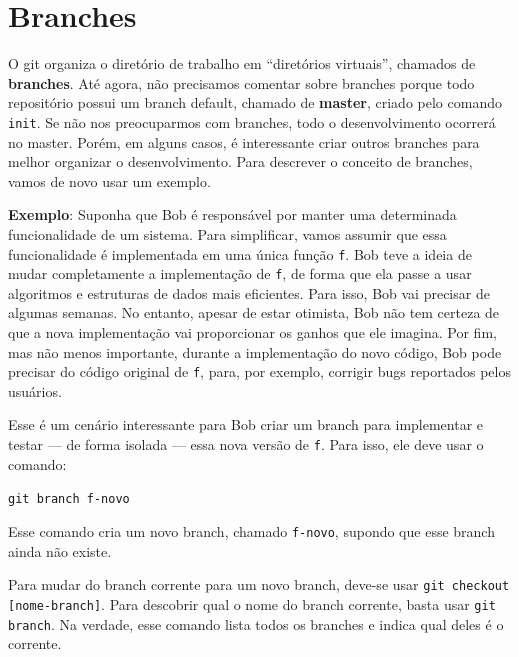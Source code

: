 \documentclass[
  11pt,
  twoside]{book}
\newcommand{\passthrough}[1]{#1}
\begin{document}
\hypertarget{branches}{%
\section{Branches}\label{branches}}

  

O git organiza o diretório de trabalho em ``diretórios virtuais'',
chamados de \textbf{branches}. Até agora, não precisamos comentar sobre
branches porque todo repositório possui um branch default, chamado de
\textbf{master}, criado pelo comando \passthrough{\lstinline!init!}. Se
não nos preocuparmos com branches, todo o desenvolvimento ocorrerá no
master. Porém, em alguns casos, é interessante criar outros branches
para melhor organizar o desenvolvimento. Para descrever o conceito de
branches, vamos de novo usar um exemplo.

\textbf{Exemplo}: Suponha que Bob é responsável por manter uma
determinada funcionalidade de um sistema. Para simplificar, vamos
assumir que essa funcionalidade é implementada em uma única função
\passthrough{\lstinline!f!}. Bob teve a ideia de mudar completamente a
implementação de \passthrough{\lstinline!f!}, de forma que ela passe a
usar algoritmos e estruturas de dados mais eficientes. Para isso, Bob
vai precisar de algumas semanas. No entanto, apesar de estar otimista,
Bob não tem certeza de que a nova implementação vai proporcionar os
ganhos que ele imagina. Por fim, mas não menos importante, durante a
implementação do novo código, Bob pode precisar do código original de
\passthrough{\lstinline!f!}, para, por exemplo, corrigir bugs reportados
pelos usuários.

Esse é um cenário interessante para Bob criar um branch para implementar
e testar --- de forma isolada --- essa nova versão de
\passthrough{\lstinline!f!}. Para isso, ele deve usar o comando:

\passthrough{\lstinline!git branch f-novo!}

Esse comando cria um novo branch, chamado
\passthrough{\lstinline!f-novo!}, supondo que esse branch ainda não
existe.

Para mudar do branch corrente para um novo branch, deve-se usar
\passthrough{\lstinline!git checkout [nome-branch]!}. Para descobrir
qual o nome do branch corrente, basta usar
\passthrough{\lstinline!git branch!}. Na verdade, esse comando lista
todos os branches e indica qual deles é o corrente.
\end{document}
